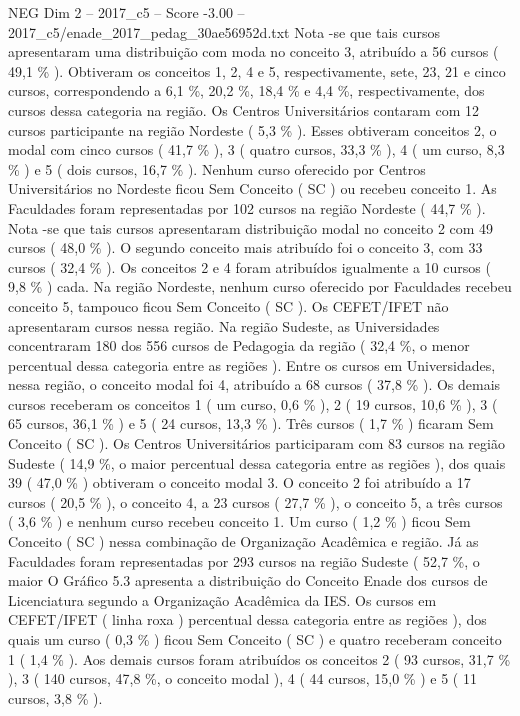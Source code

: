 \begin{textsample}{NEG Dim 2 – 2017\_c5 – Score -3.00 – 2017\_c5/enade\_2017\_pedag\_30ae56952d.txt}
Nota -se que tais cursos apresentaram uma distribuição com moda no conceito 3, atribuído a 56 cursos ( 49,1 \% ).
Obtiveram os conceitos 1, 2, 4 e 5, respectivamente, sete, 23, 21 e cinco cursos, correspondendo a 6,1 \%, 20,2 \%, 18,4 \% e 4,4 \%, respectivamente, dos cursos dessa categoria na região.
Os Centros Universitários contaram com 12 cursos participante na região Nordeste ( 5,3 \% ).
Esses obtiveram conceitos 2, o modal com cinco cursos ( 41,7 \% ), 3 ( quatro cursos, 33,3 \% ), 4 ( um curso, 8,3 \% ) e 5 ( dois cursos, 16,7 \% ).
Nenhum curso oferecido por Centros Universitários no Nordeste ficou Sem Conceito ( SC ) ou recebeu conceito 1.
As Faculdades foram representadas por 102 cursos na região Nordeste ( 44,7 \% ).
Nota -se que tais cursos apresentaram distribuição modal no conceito 2 com 49 cursos ( 48,0 \% ).
O segundo conceito mais atribuído foi o conceito 3, com 33 cursos ( 32,4 \% ).
Os conceitos 2 e 4 foram atribuídos igualmente a 10 cursos ( 9,8 \% ) cada.
Na região Nordeste, nenhum curso oferecido por Faculdades recebeu conceito 5, tampouco ficou Sem Conceito ( SC ).
Os CEFET/IFET não apresentaram cursos nessa região.
Na região Sudeste, as Universidades concentraram 180 dos 556 cursos de Pedagogia da região ( 32,4 \%, o menor percentual dessa categoria entre as regiões ).
Entre os cursos em Universidades, nessa região, o conceito modal foi 4, atribuído a 68 cursos ( 37,8 \% ).
Os demais cursos receberam os conceitos 1 ( um curso, 0,6 \% ), 2 ( 19 cursos, 10,6 \% ), 3 ( 65 cursos, 36,1 \% ) e 5 ( 24 cursos, 13,3 \% ).
Três cursos ( 1,7 \% ) ficaram Sem Conceito ( SC ).
Os Centros Universitários participaram com 83 cursos na região Sudeste ( 14,9 \%, o maior percentual dessa categoria entre as regiões ), dos quais 39 ( 47,0 \% ) obtiveram o conceito modal 3.
O conceito 2 foi atribuído a 17 cursos ( 20,5 \% ), o conceito 4, a 23 cursos ( 27,7 \% ), o conceito 5, a três cursos ( 3,6 \% ) e nenhum curso recebeu conceito 1.
Um curso ( 1,2 \% ) ficou Sem Conceito ( SC ) nessa combinação de Organização Acadêmica e região.
Já as Faculdades foram representadas por 293 cursos na região Sudeste ( 52,7 \%, o maior O Gráfico 5.3 apresenta a distribuição do Conceito Enade dos cursos de Licenciatura segundo a Organização Acadêmica da IES.
Os cursos em CEFET/IFET ( linha roxa ) percentual dessa categoria entre as regiões ), dos quais um curso ( 0,3 \% ) ficou Sem Conceito ( SC ) e quatro receberam conceito 1 ( 1,4 \% ).
Aos demais cursos foram atribuídos os conceitos 2 ( 93 cursos, 31,7 \% ), 3 ( 140 cursos, 47,8 \%, o conceito modal ), 4 ( 44 cursos, 15,0 \% ) e 5 ( 11 cursos, 3,8 \% ).

\end{textsample}
